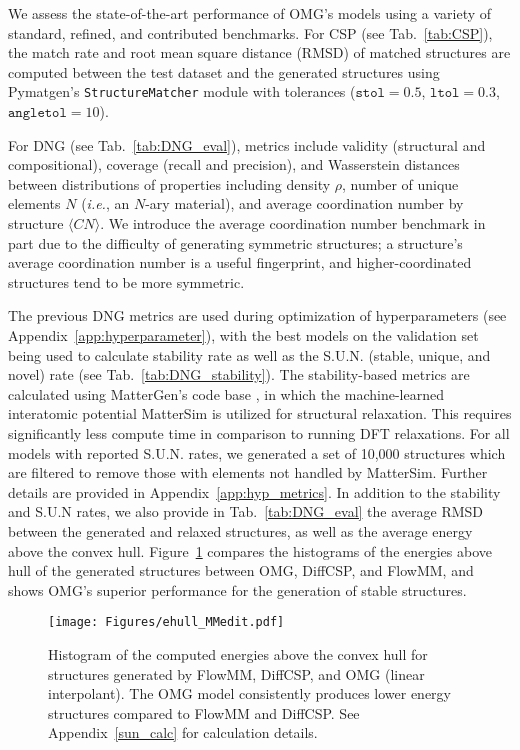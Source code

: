 We assess the state-of-the-art performance of OMG's models using a variety of standard, refined, and contributed benchmarks.
For CSP (see Tab.~\ref{tab:CSP}), the match rate and root mean square distance (RMSD) of matched structures are computed between the test dataset and the generated structures using Pymatgen's \texttt{StructureMatcher} module \citep{ong_python_2013} with tolerances ($\texttt{stol}=0.5$, $\texttt{ltol}=0.3$, $\texttt{angletol}=10$).

For DNG (see Tab.~\ref{tab:DNG_eval}), metrics include validity (structural and compositional), coverage (recall and precision), and Wasserstein distances between distributions of properties including density $\rho$, number of unique elements $N$ (\textit{i.e.}, an $N$-ary material), and average coordination number by structure $\langle CN \rangle$.
We introduce the average coordination number benchmark in part due to the difficulty of generating symmetric structures; a structure's average coordination number is a useful fingerprint, and higher-coordinated structures tend to be more symmetric.

The previous DNG metrics are used during optimization of hyperparameters (see Appendix~\ref{app:hyperparameter}), with the best models on the validation set being used to calculate stability rate as well as the S.U.N. (stable, unique, and novel) rate (see Tab.~\ref{tab:DNG_stability}).
The stability-based metrics are calculated using MatterGen's code base \citep{mattergen_microsoft_2025}, in which the machine-learned interatomic potential MatterSim \citep{yang_mattersim_2024} is utilized for structural relaxation. 
This requires significantly less compute time in comparison to running DFT relaxations.
For all models with reported S.U.N. rates, we generated a set of 10,000 structures which are filtered to remove those with elements not handled by MatterSim.
Further details are provided in Appendix~\ref{app:hyp_metrics}. In addition to the stability and S.U.N rates, we also provide in Tab.~\ref{tab:DNG_eval} the average RMSD between the generated and relaxed structures, as well as the average energy above the convex hull. Figure~\ref{fig:ehull} compares the histograms of the energies above hull of the generated structures between OMG, DiffCSP, and FlowMM, and shows OMG's superior performance for the generation of stable structures.

\begin{figure}[t]
   \centering
   \texttt{[image: Figures/ehull\_MMedit.pdf]}
   \caption{Histogram of the computed energies above the convex hull for structures generated by FlowMM, DiffCSP, and OMG (linear interpolant). The OMG model consistently produces lower energy structures compared to FlowMM and DiffCSP. See Appendix~\ref{sun_calc} for calculation details.}
   \label{fig:ehull}
\end{figure}

